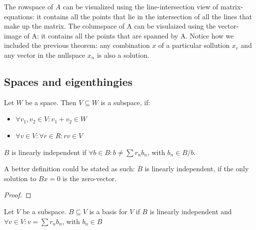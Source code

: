 The rowspace of $A$ can be visualized using the line-intersection view of matrix-equations: it contains all the points that lie in the intersection of all the lines that make up the matrix. The columspace of A can be visulaized using the vector-image of A: it contains all the points that are spanned by A. 
Notice how we included the previous theorem: any combination $x$ of a particular sollution $x_r$ and any vector in the nullspace $x_n$ is also a solution.


\subsection{Spaces and eigenthingies}

\begin{definition}
Let $W$ be a space. Then $V \subseteq W$ is a subspace, if: 
    \begin{itemize}
        \item $\forall v_1, v_2 \in V: v_1 + v_2 \in W$
        \item $\forall v \in V: \forall r \in R: rv \in V$
    \end{itemize}
\end{definition}


\begin{definition}
    $B$ is linearly independent if $\forall b \in B: b \neq \sum r_n b_n$, with $b_n \in B/b$. 
\end{definition}

\begin{theorem}
  A better definition could be stated as such: $B$ is linearly independent, if the only solution to $Bx = 0$ is the zero-vector.
\end{theorem}

\begin{proof}
\end{proof}

\begin{definition}
    Let $V$ be a subspace. $B \subseteq V$ is a basis for $V$ if $B$ is linearly independent and $\forall v \in V: v = \sum r_n b_n$, with $b_n \in B$
\end{definition}

